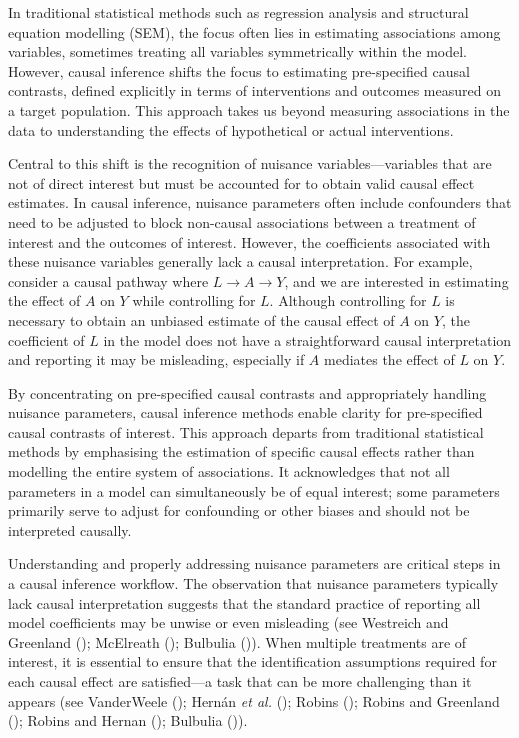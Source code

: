 \documentclass[
  singlecolumn]{article}
\begin{document}
In traditional statistical methods such as regression analysis and
structural equation modelling (SEM), the focus often lies in estimating
associations among variables, sometimes treating all variables
symmetrically within the model. However, causal inference shifts the
focus to estimating pre-specified causal contrasts, defined explicitly
in terms of interventions and outcomes measured on a target population.
This approach takes us beyond measuring associations in the data to
understanding the effects of hypothetical or actual interventions.

Central to this shift is the recognition of nuisance
variables---variables that are not of direct interest but must be
accounted for to obtain valid causal effect estimates. In causal
inference, nuisance parameters often include confounders that need to be
adjusted to block non-causal associations between a treatment of
interest and the outcomes of interest. However, the coefficients
associated with these nuisance variables generally lack a causal
interpretation. For example, consider a causal pathway where
\(L \to A \to Y\), and we are interested in estimating the effect of
\(A\) on \(Y\) while controlling for \(L\). Although controlling for
\(L\) is necessary to obtain an unbiased estimate of the causal effect
of \(A\) on \(Y\), the coefficient of \(L\) in the model does not have a
straightforward causal interpretation and reporting it may be
misleading, especially if \(A\) mediates the effect of \(L\) on \(Y\).

By concentrating on pre-specified causal contrasts and appropriately
handling nuisance parameters, causal inference methods enable clarity
for pre-specified causal contrasts of interest. This approach departs
from traditional statistical methods by emphasising the estimation of
specific causal effects rather than modelling the entire system of
associations. It acknowledges that not all parameters in a model can
simultaneously be of equal interest; some parameters primarily serve to
adjust for confounding or other biases and should not be interpreted
causally.

Understanding and properly addressing nuisance parameters are critical
steps in a causal inference workflow. The observation that nuisance
parameters typically lack causal interpretation suggests that the
standard practice of reporting all model coefficients may be unwise or
even misleading (see Westreich and Greenland
(); McElreath
(); Bulbulia
()). When multiple treatments are of
interest, it is essential to ensure that the identification assumptions
required for each causal effect are satisfied---a task that can be more
challenging than it appears (see VanderWeele
(); Hernán \emph{et al.}
();
Robins (); Robins and Greenland
(); Robins and Hernan
(); Bulbulia
()).
\end{document}
